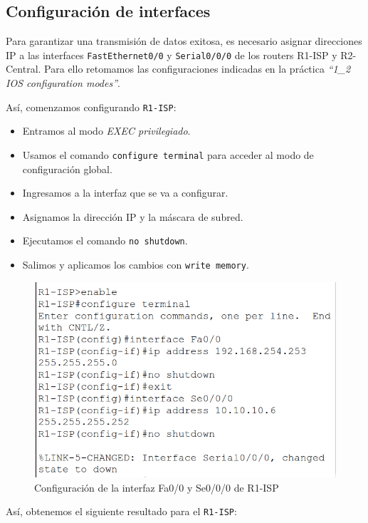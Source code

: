 \documentclass[a4paper,11pt]{article}
\begin{document}
\subsection{Configuración de interfaces}
Para garantizar una transmisión de datos exitosa, es necesario asignar
direcciones IP a las interfaces \texttt{FastEthernet0/0} y \texttt{Serial0/0/0}
de los routers R1-ISP y R2-Central. Para ello retomamos las configuraciones
indicadas en la práctica \textit{“1\_2 IOS configuration modes”}.
\vspace{0.2cm}

Así, comenzamos configurando \texttt{R1-ISP}:

\begin{itemize}
    \item Entramos al modo \textit{EXEC privilegiado}.
    \item Usamos el comando \texttt{configure terminal} para acceder al modo de
          configuración global.
    \item Ingresamos a la interfaz que se va a configurar.
    \item Asignamos la dirección IP y la máscara de subred.
    \item Ejecutamos el comando \texttt{no shutdown}.
    \item Salimos y aplicamos los cambios con \texttt{write memory}.
\end{itemize}

\begin{figure}[h]
    \includegraphics[width=1\textwidth]{images/routers/ip_r1.png}
    \caption{Configuración de la interfaz Fa0/0 y Se0/0/0 de R1-ISP}
\end{figure}

\newpage
Así, obtenemos el siguiente resultado para el \texttt{R1-ISP}:
\end{document}
